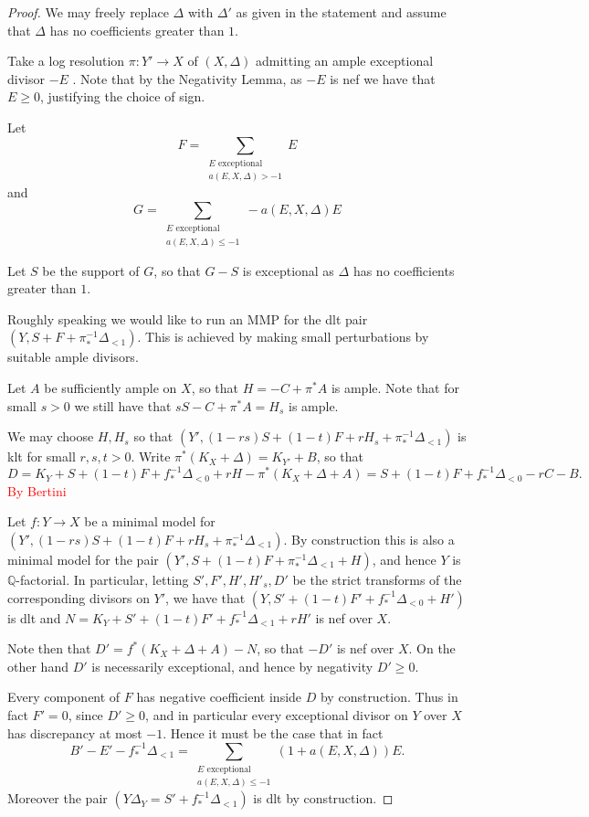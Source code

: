 \documentclass[a4paper,12pt]{book}
\newcommand\myworries[1]{\textcolor{red}{#1}}
\begin{document}
\begin{proof}
	
	We may freely replace $\Delta$ with $\Delta'$ as given in the statement and assume that $\Delta$ has no coefficients greater than $1$.
	
	Take a log resolution $\pi:Y' \to X$ of $(X,\Delta)$ admitting an ample exceptional divisor $-E$ \cite{}. Note that by the Negativity Lemma, as $-E$ is nef we have that $E \geq 0$, justifying the choice of sign.
	
	Let \[F= \sum_{\substack{E \text{ exceptional} \\ a(E,X,\Delta) > -1}} E\]
	and 
		\[G = \sum_{\substack{E \text{ exceptional} \\ a(E,X,\Delta) \leq  -1}} -a(E,X,\Delta)E\]
		
	
	Let $S$ be the support of $G$, so that $G-S$ is exceptional as $\Delta$ has no coefficients greater than $1$.
	
	Roughly speaking we would like to run an MMP for the dlt pair $(Y,S+F+\pi_{*}^{-1}\Delta_{<1})$. This is achieved by making small perturbations by suitable ample divisors.
	
	Let $A$ be sufficiently ample on $X$, so that $H=-C+\pi^{*}A$ is ample. Note that for small $s > 0$ we still have that $sS -C+\pi^{*}A=H_{s}$ is ample.
	
	We may choose $H,H_{s}$ so that $(Y', (1-rs)S+(1-t)F+rH_{s}+\pi_{*}^{-1}\Delta_{<1})$ is klt for small $r,s,t > 0$. Write $\pi^{*}(K_{X}+\Delta)=K_{Y'}+B$, so that $$D=K_{Y}+S+(1-t)F+f_{*}^{-1}\Delta_{<0}+rH-\pi^{*}(K_{X}+\Delta+A)=S+(1-t)F+f_{*}^{-1}\Delta_{<0}-rC-B.$$ \myworries{By Bertini}
	
	Let $f:Y \to X$ be a minimal model for $(Y', (1-rs)S+(1-t)F+rH_{s}+\pi_{*}^{-1}\Delta_{<1})$. By construction this is also a minimal model for the pair $(Y',S+(1-t)F+\pi_{*}^{-1}\Delta_{<1}+H)$, and hence $Y$ is $\mathbb{Q}$-factorial. In particular, letting $S',F',H', H'_{s},D'$ be the strict transforms of the corresponding divisors on $Y'$, we have that $(Y,S'+(1-t)F'+f_{*}^{-1}\Delta_{<0}+H')$ is dlt and $N=K_{Y}+S'+(1-t)F'+f_{*}^{-1}\Delta_{<1}+rH'$ is nef over $X$.
	
	Note then that $D'=f^{*}(K_{X}+\Delta+A)-N$, so that $-D'$ is nef over $X$. On the other hand $D'$ is necessarily exceptional, and hence by negativity $D' \geq 0$. 
	
 	Every component of $F$ has negative coefficient inside $D$ by construction. Thus in fact $F'=0$, since $D' \geq 0$, and in particular every exceptional divisor on $Y$ over $X$ has discrepancy at most $-1$. Hence it must be the case that in fact $$B'-E'-f_{*}^{-1}\Delta_{<1}=\sum_{\substack{E \text{ exceptional} \\ a(E,X,\Delta) \leq  -1}} (1+a(E,X,\Delta))E.$$ Moreover the pair $(Y\Delta_{Y}=S'+f_{*}^{-1}\Delta_{<1})$ is dlt by construction. 
 	

\end{proof}
\end{document}
